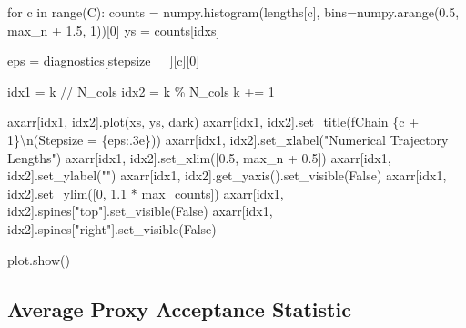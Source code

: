 \documentclass[
  letterpaper,
  DIV=11,
  numbers=noendperiod]{scrartcl}
\newenvironment{Shaded}{\begin{snugshade}}{\end{snugshade}}
\newcommand{\BuiltInTok}[1]{\textcolor[rgb]{0.00,0.23,0.31}{#1}}
\newcommand{\CharTok}[1]{\textcolor[rgb]{0.13,0.47,0.30}{#1}}
\newcommand{\ControlFlowTok}[1]{\textcolor[rgb]{0.00,0.23,0.31}{#1}}
\newcommand{\DecValTok}[1]{\textcolor[rgb]{0.68,0.00,0.00}{#1}}
\newcommand{\FloatTok}[1]{\textcolor[rgb]{0.68,0.00,0.00}{#1}}
\newcommand{\KeywordTok}[1]{\textcolor[rgb]{0.00,0.23,0.31}{#1}}
\newcommand{\NormalTok}[1]{\textcolor[rgb]{0.00,0.23,0.31}{#1}}
\newcommand{\OperatorTok}[1]{\textcolor[rgb]{0.37,0.37,0.37}{#1}}
\newcommand{\SpecialCharTok}[1]{\textcolor[rgb]{0.37,0.37,0.37}{#1}}
\newcommand{\SpecialStringTok}[1]{\textcolor[rgb]{0.13,0.47,0.30}{#1}}
\newcommand{\StringTok}[1]{\textcolor[rgb]{0.13,0.47,0.30}{#1}}
\newcommand{\VariableTok}[1]{\textcolor[rgb]{0.07,0.07,0.07}{#1}}
\begin{document}
\begin{Shaded}
\begin{Highlighting}[]
  \ControlFlowTok{for}\NormalTok{ c }\KeywordTok{in} \BuiltInTok{range}\NormalTok{(C):}
\NormalTok{    counts }\OperatorTok{=}\NormalTok{ numpy.histogram(lengths[c],}
\NormalTok{                             bins}\OperatorTok{=}\NormalTok{numpy.arange(}\FloatTok{0.5}\NormalTok{, max\_n }\OperatorTok{+} \FloatTok{1.5}\NormalTok{, }\DecValTok{1}\NormalTok{))[}\DecValTok{0}\NormalTok{]}
\NormalTok{    ys }\OperatorTok{=}\NormalTok{ counts[idxs]}

\NormalTok{    eps }\OperatorTok{=}\NormalTok{ diagnostics[}\StringTok{\textquotesingle{}stepsize\_\_\textquotesingle{}}\NormalTok{][c][}\DecValTok{0}\NormalTok{]}

\NormalTok{    idx1 }\OperatorTok{=}\NormalTok{ k }\OperatorTok{//}\NormalTok{ N\_cols}
\NormalTok{    idx2 }\OperatorTok{=}\NormalTok{ k }\OperatorTok{\%}\NormalTok{ N\_cols}
\NormalTok{    k }\OperatorTok{+=} \DecValTok{1}

\NormalTok{    axarr[idx1, idx2].plot(xs, ys, dark)}
\NormalTok{    axarr[idx1, idx2].set\_title(}\SpecialStringTok{f\textquotesingle{}Chain }\SpecialCharTok{\{}\NormalTok{c }\OperatorTok{+} \DecValTok{1}\SpecialCharTok{\}}\CharTok{\textbackslash{}n}\SpecialStringTok{(Stepsize = }\SpecialCharTok{\{}\NormalTok{eps}\SpecialCharTok{:.3e\}}\SpecialStringTok{)\textquotesingle{}}\NormalTok{)}
\NormalTok{    axarr[idx1, idx2].set\_xlabel(}\StringTok{"Numerical Trajectory Lengths"}\NormalTok{)}
\NormalTok{    axarr[idx1, idx2].set\_xlim([}\FloatTok{0.5}\NormalTok{, max\_n }\OperatorTok{+} \FloatTok{0.5}\NormalTok{])}
\NormalTok{    axarr[idx1, idx2].set\_ylabel(}\StringTok{""}\NormalTok{)}
\NormalTok{    axarr[idx1, idx2].get\_yaxis().set\_visible(}\VariableTok{False}\NormalTok{)}
\NormalTok{    axarr[idx1, idx2].set\_ylim([}\DecValTok{0}\NormalTok{, }\FloatTok{1.1} \OperatorTok{*}\NormalTok{ max\_counts])}
\NormalTok{    axarr[idx1, idx2].spines[}\StringTok{"top"}\NormalTok{].set\_visible(}\VariableTok{False}\NormalTok{)}
\NormalTok{    axarr[idx1, idx2].spines[}\StringTok{"right"}\NormalTok{].set\_visible(}\VariableTok{False}\NormalTok{)}

\NormalTok{  plot.show()}
\end{Highlighting}
\end{Shaded}

\subsection{Average Proxy Acceptance
Statistic}\label{average-proxy-acceptance-statistic}
\end{document}
